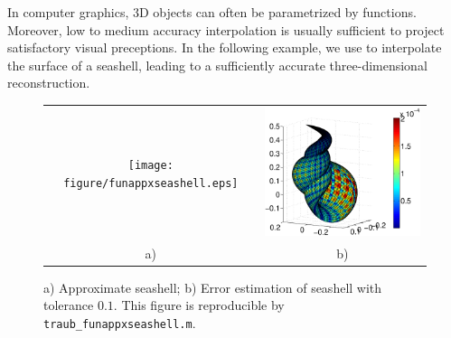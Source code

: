 
In computer graphics, 3D objects can often be parametrized by functions.
Moreover, low to medium accuracy interpolation is usually sufficient to project
satisfactory visual preceptions. In the following example, we use \funappxg to
interpolate the surface of a seashell, leading to a sufficiently accurate
three-dimensional reconstruction.

\begin{figure}[tbh]
  \centering
  \begin{tabular}{cc}
  \texttt{[image: figure/funappxseashell.eps]} & \includegraphics[width=83mm]{figure/seashellsurferror.eps}\\
  a) & b)
  \end{tabular}
 \caption{a) Approximate seashell; b) Error estimation of seashell with tolerance $0.1$. This figure is reproducible by \texttt{traub\_funappxseashell.m}.}
  \label{fig:funappxseashell}
\end{figure}
